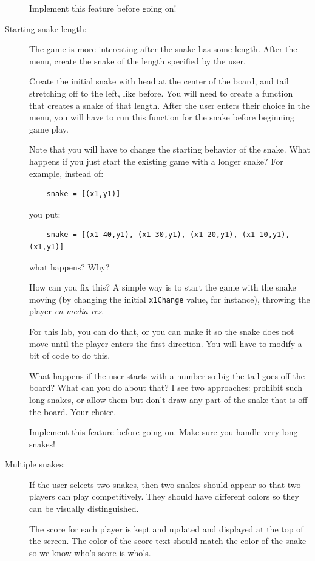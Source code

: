 \documentclass[12pt]{article}
\begin{document}
\begin{description}
Implement this feature before going on!

\item[Starting snake length:] 
The game is more interesting after the snake
has some length.  After the menu, create the snake
of the length specified by the user.

Create the initial snake with head
at the center of the board, and tail stretching off to
the left, like before.  You will need to create a function that
creates a snake of that length.  After the user
enters their choice in the menu, you will have to
run this function for the snake before beginning 
game play.

Note that you will have to change the starting
behavior of the snake.  What happens if you 
just start the existing game with a longer snake?  For example,
instead of:
\begin{lstlisting}
    snake = [(x1,y1)]
\end{lstlisting}
you put:
\begin{lstlisting}
    snake = [(x1-40,y1), (x1-30,y1), (x1-20,y1), (x1-10,y1), (x1,y1)]
\end{lstlisting}
what happens?  Why?

How can you fix this?  A simple way is to start the game with the snake
moving (by changing the initial
\lstinline{x1Change} value, for instance), 
throwing the player {\em en media res}.  

For this lab, you can do that, or
you can make it so the snake does not move until
the player enters the first direction.  
You will have to modify a bit of code to do this.

What happens if the user starts with a number
so big the tail goes off the board?  What can you do
about that?  I see two approaches:  prohibit such long
snakes, or allow them but don't draw any part of the snake
that is off the board.  Your choice.

Implement this feature before going on.  Make sure you handle
very long snakes!

\item[Multiple snakes:]  If the user selects two snakes,
then two snakes should appear so that two players
can play competitively.  They should have different
colors so they can be visually distinguished.

The score for each player is kept and updated and displayed
at the top of the screen.  The color of the score text
should match the color of the snake so we know who's score is who's.


\end{description}
\end{document}
